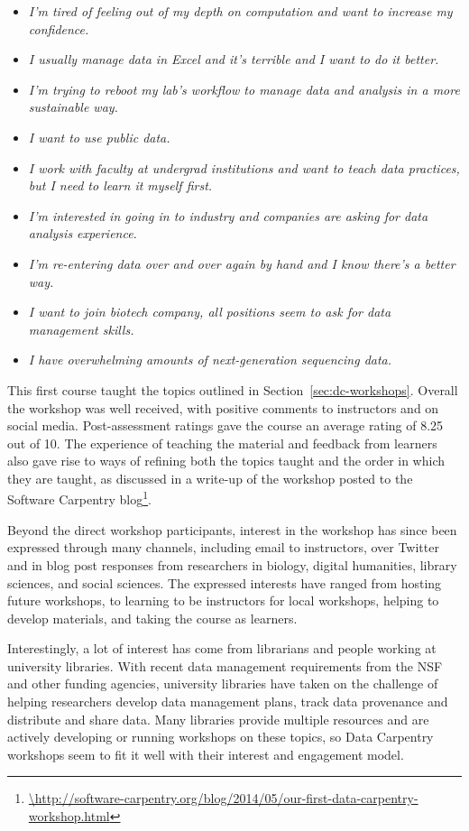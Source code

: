 \documentclass[11pt]{article}
\begin{document}
\begin{itemize}
\item \emph{I'm tired of feeling out of my depth on computation and want to increase my confidence.}
\item \emph{I usually manage data in Excel and it's terrible and I want to do it better.}
\item \emph{I'm trying to reboot my lab's workflow to manage data and analysis in a more sustainable way.}
\item \emph{I want to use public data.}
\item \emph{I work with faculty at undergrad institutions and want to teach data practices, but I need to learn it myself first.}
\item \emph{I'm interested in going in to industry and companies are asking for data analysis experience.}
\item \emph{I'm re-entering data over and over again by hand and I know there's a better way.}
\item \emph{I want to join biotech company, all positions seem to ask for data management skills.}
\item \emph{I have overwhelming amounts of next-generation sequencing data.}
\end{itemize}

This first course taught the topics outlined in Section~\ref{sec:dc-workshops}. Overall the workshop was well received, with positive comments to instructors and on social media. Post-assessment ratings gave the course an average rating of 8.25 out of 10. The experience of teaching the material and feedback from learners also gave rise to ways of refining both the topics taught and the order in which they are taught, as discussed in a write-up of the workshop posted to the Software Carpentry blog\footnote{\url{\http://software-carpentry.org/blog/2014/05/our-first-data-carpentry-workshop.html}}.

Beyond the direct workshop participants, interest in the workshop has since been expressed through many channels, including email to instructors, over Twitter and in blog post responses from researchers in biology, digital humanities, library sciences, and social sciences.
The expressed interests have  
ranged from hosting future workshops, to learning to be 
instructors for local workshops, helping to develop materials, and taking the course as learners.

Interestingly, a lot of interest has come from librarians and people working at university libraries. With recent data management requirements from the NSF and other funding agencies, university libraries have
taken on the challenge of helping researchers develop data management plans, track data provenance and 
distribute and share data. Many libraries provide multiple resources and are actively developing or running workshops
on these topics, so Data Carpentry workshops seem to fit it well with their interest and engagement model.
\end{document}
